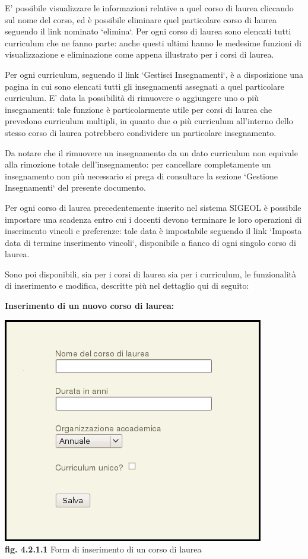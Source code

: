 \documentclass[11pt,a4paper]{article}
\begin{document}
E' possibile visualizzare le informazioni relative a quel corso di laurea cliccando sul nome del corso, ed è possibile eliminare quel particolare corso di laurea seguendo il link nominato `elimina`.
Per ogni corso di laurea sono elencati tutti curriculum che ne fanno parte: anche questi ultimi hanno le medesime funzioni di visualizzazione e eliminazione come appena illustrato per i corsi di laurea.

Per ogni curriculum, seguendo il link `Gestisci Insegnamenti`, è a disposizione una pagina in cui sono elencati tutti gli insegnamenti assegnati a quel particolare curriculum. E' data la possibilità di rimuovere o aggiungere uno o più insegnamenti: tale funzione è particolarmente utile per corsi di laurea che prevedono curriculum multipli, in quanto due o più curriculum all'interno dello stesso corso di laurea potrebbero condividere un particolare insegnamento.

Da notare che il rimuovere un insegnamento da un dato curriculum non equivale alla rimozione totale dell'insegnamento: per cancellare completamente un insegnamento non più necessario si prega di consultare la sezione `Gestione Insegnamenti` del presente documento.

Per ogni corso di laurea precedentemente inserito nel sistema SIGEOL è possibile impostare una scadenza entro cui i docenti devono terminare le loro operazioni di inserimento vincoli e preferenze: tale data è impostabile seguendo il link `Imposta data di termine inserimento vincoli`, disponibile a fianco di ogni singolo corso di laurea.

Sono poi disponibili, sia per i corsi di laurea sia per i curriculum, le funzionalità di inserimento e modifica, descritte più nel dettaglio qui di seguito:
\newline \newline
\begin{large}\textbf{Inserimento di un nuovo corso di laurea:}\end{large}

\begin{center}
	\includegraphics[scale=0.5]{images/nuovo_corso.jpg}\\
	\textbf{fig. 4.2.1.1} Form di inserimento di un corso di laurea\\
\end{center}
\end{document}
